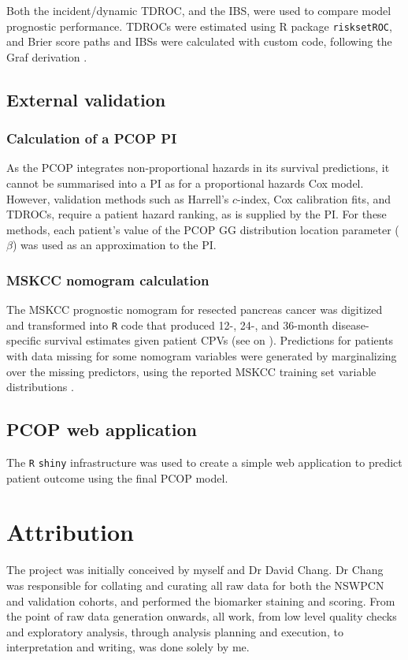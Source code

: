 \documentclass[dissertation.tex]{subfiles}
\begin{document}
Both the incident/dynamic \gls{TDROC}, and the \gls{IBS}, were used to compare model prognostic performance.  \glspl{TDROC} were estimated using R package \texttt{risksetROC}, and Brier score paths and \glspl{IBS} were calculated with custom code, following the Graf derivation \cite{Graf1999}.


\subsection{External validation}
\subsubsection{Calculation of a \acrshort{PCOP} \acrlong{PI}}
As the \gls{PCOP} integrates non-proportional hazards in its survival predictions, it cannot be summarised into a \gls{PI} as for a proportional hazards Cox model.  However, validation methods such as Harrell's $c$-index, Cox calibration fits, and \glspl{TDROC}, require a patient hazard ranking, as is supplied by the \gls{PI}.  For these methods, each patient's value of the \gls{PCOP} \gls{GG} distribution location parameter ($\beta$) was used as an approximation to the \gls{PI}.

\subsubsection{\acrshort{MSKCC} nomogram calculation}
The \gls{MSKCC} prognostic nomogram for resected pancreas cancer \cite{Brennan2004} was digitized and transformed into \texttt{R} code that produced 12-, 24-, and 36-month disease-specific survival estimates given patient \glspl{CPV} (see  on ).  Predictions for patients with data missing for some nomogram variables were generated by marginalizing over the missing predictors, using the reported \gls{MSKCC} training set variable distributions \cite{Brennan2004}.

\subsection{PCOP web application}
The \texttt{R} \texttt{shiny} infrastructure was used to create a simple web application to predict patient outcome using the final \gls{PCOP} model.

\section{Attribution}
The project was initially conceived by myself and Dr David Chang.  Dr Chang was responsible for collating and curating all raw data for both the \gls{NSWPCN} and validation cohorts, and performed the biomarker staining and scoring.  From the point of raw data generation onwards, all work, from low level quality checks and exploratory analysis, through analysis planning and execution, to interpretation and writing, was done solely by me.
\end{document}
